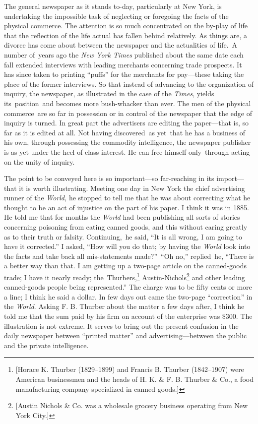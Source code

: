 \documentclass[twoside,symmetric,nobib,justified]{tufte-book}
\begin{document}
The general newspaper as it stands to-day, particularly at New York, is
undertaking the impossible task of neglecting or foregoing the facts of
the physical commerce. The attention is so much concentrated on the
by-play of life that the reflection of the life actual has fallen behind
relatively. As things are, a divorce has come about between the
newspaper and the actualities of life.~A number of~years ago the
\emph{New York Times} published about the same date each fall extended
interviews with leading merchants concerning trade prospects. It has
since taken to printing ``puffs'' for the merchants for pay---these
taking the place of the former interviews. So that instead of advancing
to the organization of inquiry, the newspaper, as illustrated in the
case of the \emph{Times}, yields its~position~and becomes more
bush-whacker than ever. The men of the physical commerce~are so far in
possession or in control of the newspaper that the edge of inquiry is
turned. In great part the advertisers are editing the paper---that is,
so far as it is edited at all. Not having discovered~as yet~that he has
a business of his own, through possessing the commodity intelligence,
the newspaper publisher is as yet under the heel of class interest. He
can free himself only~through acting on the unity of inquiry.~

The point to be conveyed here is so important---so far-reaching in its
import---that it is worth illustrating. Meeting one day in New York the
chief advertising runner of the \emph{World,} he stopped to tell me that
he was about correcting what he thought to be an act of injustice on the
part of his paper. I think it was in 1885. He told me that for months
the \emph{World} had been publishing all sorts of stories concerning
poisoning from eating canned goods, and this without caring greatly as
to their truth or falsity. Continuing,~he said, ``It is all wrong, I am
going to have it corrected.'' I asked, ``How will you do that; by having
the \emph{World} look into the facts and take back all mis-statements
made?''~``Oh no,'' replied~he, ``There is a better way than that. I am
getting up a two-page article on the canned-goods trade; I have it
nearly ready; the~Thurbers,\footnote{{[}Horace K. Thurber (1829--1899)
  and Francis B. Thurber (1842--1907) were American businessmen and the
  heads of H. K. \& F. B. Thurber \& Co., a food manufacturing company
  specialized in canned goods.{]}} Austin-Nichols\footnote{{[}Austin
  Nichols \& Co. was a wholesale grocery business operating from New
  York City.{]}} and other leading canned-goods people being
represented.'' The charge was to be fifty cents or more a line; I think
he said a dollar. In few days out came the two-page ``correction'' in
the \emph{World}. Asking F. B. Thurber about the matter a few days
after, I think he told me that the sum paid by his firm on account of
the enterprise was \$300. The illustration is not extreme. It serves to
bring out the present confusion in the daily newspaper between ``printed
matter'' and advertising---between the public and the private
intelligence.~
\end{document}
